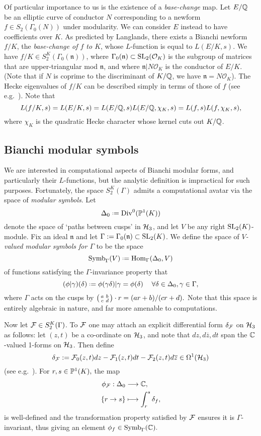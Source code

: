 \documentclass[a4paper,11pt]{article}
\numberwithin{equation}{section}
\newcommand{\fn}{\mathfrak{n}}
\begin{document}
Of particular importance to us is the existence of a \emph{base-change} map. Let $E/\mathbb{Q}$ be an elliptic curve of conductor $N$ corresponding to a newform $f \in S_2(\Gamma_0(N))$ under modularity. We can consider $E$ instead to have coefficients over $K$. As predicted by Langlands, there exists a Bianchi newform $f/K$, the \emph{base-change of $f$ to $K$}, whose $L$-function is equal to $L(E/K,s)$. We have $f/K \in S_2^K(\Gamma_0(\fn))$, where $\Gamma_0(\fn) \subset \SLt(\mathcal{O}_K)$ is the subgroup of matrices that are upper-triangular mod $\fn$, and where $\fn|N\mathcal{O}_K$ is the conductor of $E/K$. (Note that if $N$ is coprime to the discriminant of $K/\mathbb{Q}$, we have $\fn = N\mathcal{O}_K$). The Hecke eigenvalues of $f/K$ can be described simply in terms of those of $f$ (see e.g.\ \cite[\S7.2]{BW18}). Note that
\[
    L(f/K,s) = L(E/K,s) = L(E/\mathbb{Q},s)L(E/\mathbb{Q},\chi_K,s) =  L(f,s)L(f,\chi_K,s),
\]
where $\chi_K$ is the quadratic Hecke character whose kernel cuts out $K/\mathbb{Q}$.




\subsection{Bianchi modular symbols}
We are interested in computational aspects of Bianchi modular forms, and particularly their $L$-functions, but the analytic definition is impractical for such purposes. Fortunately, the space $S_2^K(\Gamma)$ admits a computational avatar via the space of \emph{modular symbols}. Let
\[
    \Delta_0 \defeq \mathrm{Div}^0(\Proj(K))
\]
denote the space of `paths between cusps' in $\mathcal{H}_3$, and let $V$ be any right $\mathrm{SL}_2(K)$-module. Fix an ideal $\fn$ and let $\Gamma := \Gamma_0(\fn) \subset\SLt(K)$. We define the space of \emph{$V$-valued modular symbols for $\Gamma$} to be the space
\[
    \symb_{\Gamma}(V) \defeq \mathrm{Hom}_\Gamma(\Delta_0,V)
\]
of functions satisfying the $\Gamma$-invariance property that
\[(\phi|\gamma)(\delta)\defeq \phi(\gamma \delta)|\gamma = \phi(\delta)\hspace{12pt} \forall \delta\in\Delta_0, \gamma\in\Gamma,\]
where $\Gamma$ acts on the cusps by $\left(\begin{smallmatrix}a & b\\c & d\end{smallmatrix}\right)\cdot r = (ar+b)/(cr+d).$  Note that this space is entirely algebraic in nature, and far more amenable to computations.

Now let $\mathcal{F} \in S_2^K(\Gamma)$. To $\mathcal{F}$ one may attach an explicit differential form $\delta_{\mathcal{F}}$ on $\mathcal{H}_3$ as follows: let $(z,t)$ be a co-ordinate on $\mathcal{H}_3$, and note that $dz, d\overline{z}, dt$ span the $\mathbb{C}$-valued 1-forms on $\mathcal{H}_3$. Then define
\[
    \delta_{\mathcal{F}} := \mathcal{F}_0(z,t)dz - \mathcal{F}_1(z,t)dt - \mathcal{F}_2(z,t)d\overline{z} \in \Omega^1(\mathcal{H}_3)
\]
(see e.g.\ \cite{CrWh94}). For $r,s \in \mathbb{P}^1(K),$ the map
\begin{align*}
    \phi_{\mathcal{F}} : \Delta_0 &\longrightarrow \mathbb{C},\\
    \{r\to s\} &\longmapsto \int_{r}^s \delta_f,
\end{align*}
is well-defined and the transformation property satisfied by $\mathcal{F}$ ensures it is $\Gamma$-invariant, thus giving an element $\phi_f \in \mathrm{Symb}_\Gamma(\mathbb{C}).$
\end{document}
